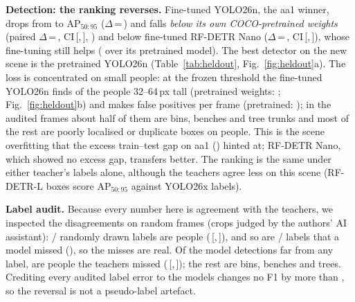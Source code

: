 \documentclass[conference]{IEEEtran}
\newcommand{\AP}{AP$_{50:95}$}
\newcommand{\yolo}{YOLO26n}
\newcommand{\rfdetr}{RF-DETR Nano}
\newcommand{\ci}[2]{\,[#1,\,#2]}
\begin{document}
\textbf{Detection: the ranking reverses.} Fine-tuned \yolo{}, the aa1 winner, drops from \ApYoloFt{} to \HoApYoloFt{} \AP{}
($\Delta$\,=\,\HoDropYoloFt) and falls \emph{below its own COCO-pretrained weights} (paired $\Delta$\,=\,\HoDeltaYoloFtPt,
CI\ci{\HoDeltaLoYoloFtPt}{\HoDeltaHiYoloFtPt}, \HoPvalYoloFtPt) and below fine-tuned \rfdetr{} ($\Delta$\,=\,\HoDeltaFtFt,
CI\ci{\HoDeltaLoFtFt}{\HoDeltaHiFtFt}), whose fine-tuning still helps (\HoDeltaRfFtPt{} over its pretrained model).
The best detector on the new scene is the pretrained \yolo{} (Table~\ref{tab:heldout}, Fig.~\ref{fig:heldout}a). The
loss is concentrated on small people: at the frozen threshold the fine-tuned \yolo{} finds \HoRecSmallYoloFt{} of the
people 32--64\,px tall (pretrained weights: \HoRecSmallYoloPt; Fig.~\ref{fig:heldout}b) and makes
\HoFppiYoloFt{} false positives per frame (pretrained: \HoFppiYoloPt); in the audited frames about half of them are
bins, benches and tree trunks and most of the rest are poorly localised or duplicate boxes on people.
This is the scene overfitting that the excess train--test gap on aa1 (\ExcessYoloFt) hinted at; \rfdetr{}, which showed
no excess gap, transfers better. The ranking is the same under either teacher's labels alone, although the teachers
agree less on this scene (RF-DETR-L boxes score \HoTeacherAgree{} \AP{} against YOLO26x labels).

\textbf{Label audit.} Because every number here is agreement with the teachers, we inspected the disagreements on
\HoAuFrames{} random frames (crops judged by the authors' AI assistant): \HoAuLabPerson/\HoAuLabN{} randomly drawn
labels are people (\HoAuLabRate\ci{\HoAuLabLo}{\HoAuLabHi}), and so are \HoAuFnPerson/\HoAuFnN{} labels that a model
missed (\HoAuFnRate), so the misses are real. Of the \HoAuFpN{} model detections far from any label,
\HoAuFpPerson{} are people the teachers missed (\HoAuFpRate\ci{\HoAuFpLo}{\HoAuFpHi}); the rest are bins, benches and
trees. Crediting every audited label error to the models changes no F1 by more than \HoAuMaxFoneShift, so the
reversal is not a pseudo-label artefact.
\end{document}
